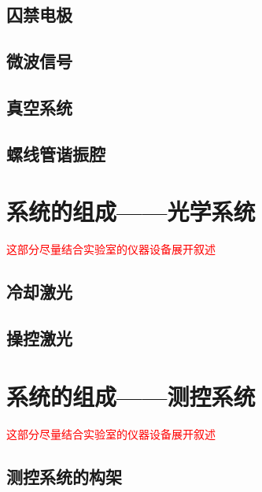 \subsection[囚禁电极]{囚禁电极}


\subsection[微波信号]{微波信号}


\subsection[真空系统]{真空系统}


\subsection[螺线管谐振腔]{螺线管谐振腔}











\section[系统的组成——光学系统]{系统的组成——光学系统}
\textcolor{red}{这部分尽量结合实验室的仪器设备展开叙述}

\subsection[冷却激光]{冷却激光}

\subsection[操控激光]{操控激光}






\section[系统的组成——测控系统]{系统的组成——测控系统}
\textcolor{red}{这部分尽量结合实验室的仪器设备展开叙述}
\subsection[测控系统的构架]{测控系统的构架}

